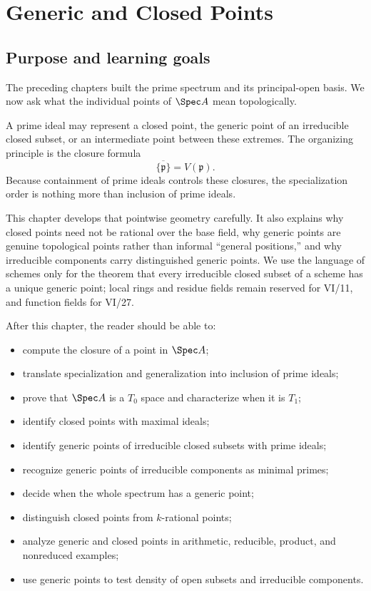 
\chapter{Generic and Closed Points}
\label{ch:generic-closed-points}

\section*{Purpose and learning goals}

The preceding chapters built the prime spectrum and its principal-open basis.  We now ask
what the individual points of $\Spec A$ mean topologically.

A prime ideal may represent a closed point, the generic point of an irreducible closed
subset, or an intermediate point between these extremes.  The organizing principle is the
closure formula
\[
\overline{\{\mathfrak p\}}=V(\mathfrak p).
\]
Because containment of prime ideals controls these closures, the specialization order is
nothing more than inclusion of prime ideals.

This chapter develops that pointwise geometry carefully.  It also explains why closed
points need not be rational over the base field, why generic points are genuine topological
points rather than informal ``general positions,'' and why irreducible components carry
distinguished generic points.  We use the language of schemes only for the theorem
that every irreducible closed subset of a scheme has a unique generic point; local rings and
residue fields remain reserved for VI/11, and function fields for VI/27.

After this chapter, the reader should be able to:
\begin{itemize}
\item compute the closure of a point in $\Spec A$;
\item translate specialization and generalization into inclusion of prime ideals;
\item prove that $\Spec A$ is a $T_0$ space and characterize when it is $T_1$;
\item identify closed points with maximal ideals;
\item identify generic points of irreducible closed subsets with prime ideals;
\item recognize generic points of irreducible components as minimal primes;
\item decide when the whole spectrum has a generic point;
\item distinguish closed points from $k$-rational points;
\item analyze generic and closed points in arithmetic, reducible, product, and
      nonreduced examples;
\item use generic points to test density of open subsets and irreducible components.
\end{itemize}

